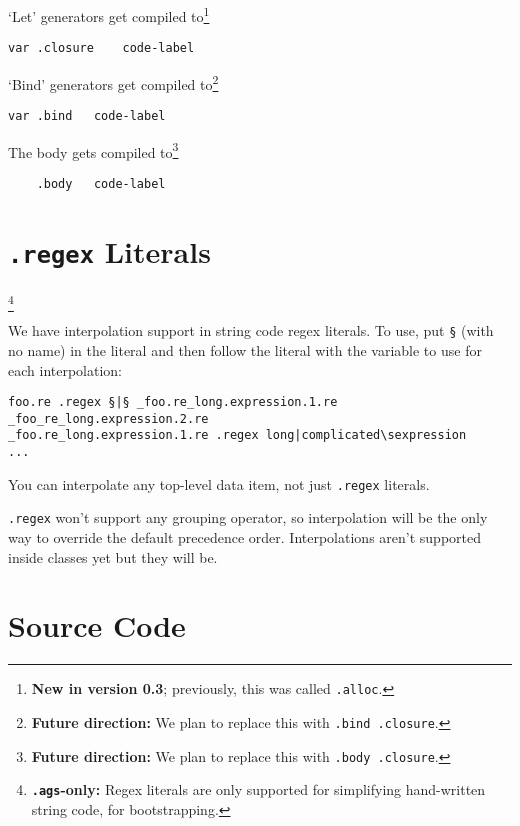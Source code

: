 \documentclass{report}
\newcommand\stringcode[1]{\texttt{#1}}
\newcommand\agsonly[1]{\footnote{\textbf{\texttt{.ags}-only: }#1}}
\newcommand\new[2]{\footnote{\textbf{New in version #1}; previously, #2}}
\newcommand\future[1]{\footnote{\textbf{Future direction:} #1}}
\begin{document}
`Let' generators get compiled to\new{0.3}{this was called \stringcode{.alloc}.}
\begin{verbatim}
var	.closure	code-label
\end{verbatim}
`Bind' generators get compiled to\future{We plan to replace this with \stringcode{.bind .closure}.}
\begin{verbatim}
var	.bind	code-label
\end{verbatim}
The body gets compiled to\future{We plan to replace this with \stringcode{.body .closure}.}
\begin{verbatim}
	.body	code-label
\end{verbatim}

\chapter{\stringcode{.regex} Literals}\agsonly{Regex literals are only supported for simplifying hand-written string code, for bootstrapping.}

We have interpolation support in string code regex literals.
To use, put \stringcode{§} (with no name) in the literal
and then follow the literal with the variable to use for each interpolation:
\begin{verbatim}
foo.re .regex §|§ _foo.re_long.expression.1.re _foo_re_long.expression.2.re
_foo.re_long.expression.1.re .regex long|complicated\sexpression
...
\end{verbatim}

You can interpolate any top-level data item, not just \stringcode{.regex} literals.

\stringcode{.regex} won't support any grouping operator,
so interpolation will be the only way to override the default precedence order.
Interpolations aren't supported inside classes yet but they will be.

\chapter{Source Code}
\end{document}
